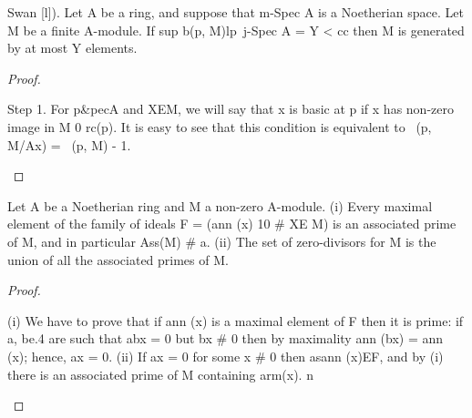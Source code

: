 \begin{theorem}[Theorem 5.8]\label{mcrt-auto-theorem-5-8}\uses{}
\begin{mathematicalrecord}
Swan [l]). Let A be a ring, and suppose that m-Spec A is
a Noetherian space. Let M be a finite A-module. If
         sup {b(p, M)lp~j-Spec A} = Y < cc
then M is generated by at most Y elements.
\end{mathematicalrecord}
\end{theorem}
\begin{proof}
\begin{mathematicalrecord}
Step 1. For p&pecA     and XEM, we will say that x is basic at p if x
has non-zero image in M 0 rc(p). It is easy to see that this condition is
equivalent to ~(p, M/Ax) = ~(p, M) - 1.
\end{mathematicalrecord}
\end{proof}


\begin{theorem}[Theorem 6.1]\label{mcrt-auto-theorem-6-1}\uses{}
\begin{mathematicalrecord}
Let A be a Noetherian         ring and M a non-zero A-module.
   (i) Every maximal element of the family of ideals F = (ann (x) 10 # XE M)
is an associated prime of M, and in particular Ass(M) # a.
   (ii) The set of zero-divisors for M is the union of all the associated primes
of M.
\end{mathematicalrecord}
\end{theorem}
\begin{proof}
\begin{mathematicalrecord}
(i) We have to prove that if ann (x) is a maximal element of F then it
is prime: if a, be.4 are such that abx = 0 but bx # 0 then by maximality
ann (bx) = ann (x); hence, ax = 0.
   (ii) If ax = 0 for some x # 0 then asann (x)EF, and by (i) there is an
associated prime of M containing arm(x). n
\end{mathematicalrecord}
\end{proof}


